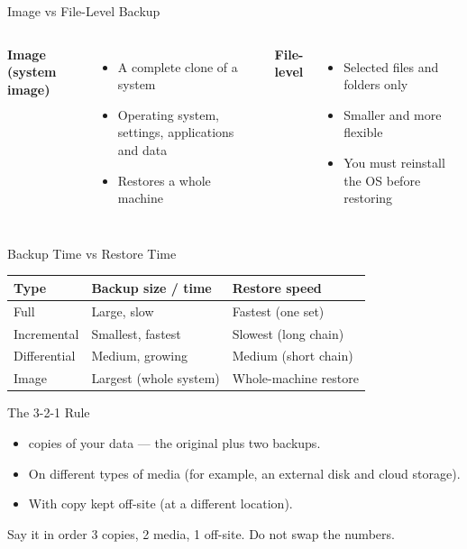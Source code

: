 \documentclass[aspectratio=169]{beamer}
\begin{document}
\begin{frame}{Image vs File-Level Backup}
  \begin{columns}[T]
      \textbf{Image (system image)}
      \begin{itemize}
        \item A complete clone of a system
        \item Operating system, settings, applications and data
        \item Restores a whole machine
      \end{itemize}
      \textbf{File-level}
      \begin{itemize}
        \item Selected files and folders only
        \item Smaller and more flexible
        \item You must reinstall the OS before restoring
      \end{itemize}
  \end{columns}
  \vspace{0.3cm}
\end{frame}

\begin{frame}{Backup Time vs Restore Time}
  \begin{center}
    \begin{tabular}{lll}
      \toprule
      \textbf{Type} & \textbf{Backup size / time} & \textbf{Restore speed} \\
      \midrule
      Full & Large, slow & Fastest (one set) \\
      Incremental & Smallest, fastest & Slowest (long chain) \\
      Differential & Medium, growing & Medium (short chain) \\
      Image & Largest (whole system) & Whole-machine restore \\
      \bottomrule
    \end{tabular}
  \end{center}
  \vspace{0.3cm}
\end{frame}

\begin{frame}{The 3-2-1 Rule}
  \begin{itemize}
    \item {} copies of your data --- the original plus two backups.
    \item On  different types of media (for example, an external disk
      and cloud storage).
    \item With  copy kept off-site (at a different location).
  \end{itemize}
  \begin{alertblock}{Say it in order}
    3 copies, 2 media, 1 off-site. Do not swap the numbers.
  \end{alertblock}
\end{frame}
\end{document}
